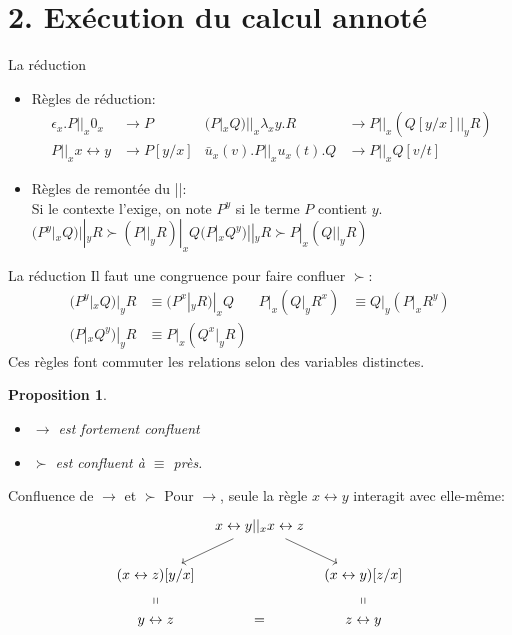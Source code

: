 \documentclass[11pt]{beamer}
\newcommand{\tto}{\leftrightarrow}
\newtheorem{prop}{Proposition}
\begin{document}
\section{2. Exécution du calcul annoté}

\begin{frame}{La réduction}
\begin{itemize}
\item Règles de réduction:
\begin{align*}
\epsilon_x.P ||_x 0_x &\to P & (P|_xQ)||_x\lambda_xy.R &\to P||_x(Q[y/x]||_yR)\\
P||_x x\tto y &\to P[y/x] & \bar{u}_x(v).P||_xu_x(t).Q &\to P||_x Q[v/t]
\end{align*}
\pause\item Règles de remontée du ||:\\
Si le contexte l'exige, on note $P^y$ si le terme $P$ contient $y$.\\
$(P^y|_xQ)||_yR \succ (P||_yR)|_xQ$\hfill$(P|_xQ^y)||_yR \succ P|_x(Q||_yR)$
\end{itemize}
\end{frame}

\begin{frame}{La réduction}
Il faut une congruence pour faire confluer $\succ$:
\begin{align*}
(P^y|_xQ)|_yR &\equiv (P^x|_yR)|_xQ & P|_x(Q|_yR^x) &\equiv Q|_y(P|_xR^y)\\
(P|_xQ^y)|_yR &\equiv P|_x(Q^x|_yR)
\end{align*}
Ces règles font commuter les relations selon des variables distinctes.
\begin{prop}
\begin{itemize}
\item $\to$ est fortement confluent
\item $\succ$ est confluent à $\equiv$ près.
\end{itemize}
\end{prop}
\end{frame}

\begin{frame}{Confluence de $\to$ et $\succ$}
Pour $\to$, seule la règle $x \tto y$ interagit avec elle-même:
\[\begin{tikzcd}[ampersand replacement=\&, column sep=tiny]
\& x\tto y ||_x x\tto z \arrow[dl] \arrow[dr] \&\\
(x\tto z)[y/x]\arrow[d, phantom, "\shortparallel"] \& \& (x\tto y)[z/x]\arrow[d, phantom, "\shortparallel"]\\
y\tto z \& = \& z\tto y
\end{tikzcd}\]
\end{frame}
\end{document}
